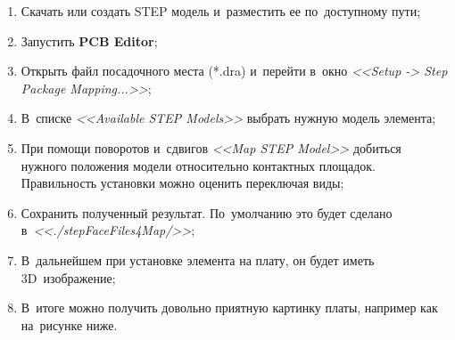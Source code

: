 \begin{enumerate}
	\item Скачать или создать STEP модель и~разместить ее по~доступному пути;
	
	\item Запустить \textbf{PCB Editor};
	
	\item Открыть файл посадочного места (*.dra) и~перейти в~окно \textit{<<Setup -> Step Package Mapping...>>};
	
	\item В~списке \textit{<<Available STEP Models>>} выбрать нужную модель элемента;
	
	\begin{figure}[H]
	\end{figure}
	
	\item При помощи поворотов и~сдвигов \textit{<<Map STEP Model>>} добиться нужного положения модели относительно контактных площадок. Правильность установки можно оценить переключая виды;
	\item Сохранить полученный результат. По~умолчанию это будет сделано в~\textit{<<./stepFaceFiles4Map/>>};
	
	\item В~дальнейшем при установке элемента на плату, он будет иметь 3D~изображение;
	
	\item В~итоге можно получить довольно приятную картинку платы, например как на~рисунке ниже.
	
	\begin{figure}[H]
	\end{figure}
\end{enumerate}

